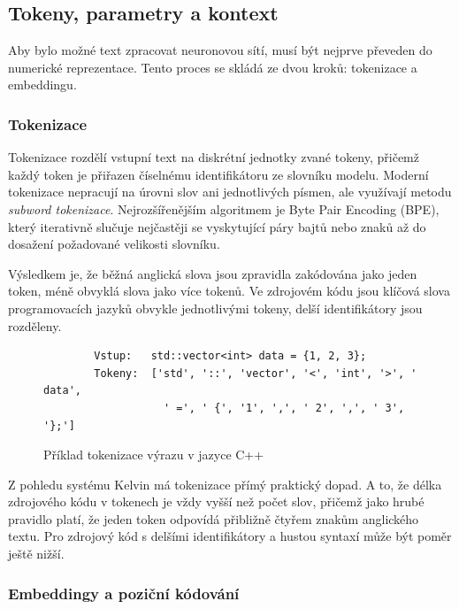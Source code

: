 \subsection{Tokeny, parametry a kontext}
\label{subsec:llm-tokens-parameters-context}

Aby bylo možné text zpracovat neuronovou sítí, musí být nejprve převeden do numerické reprezentace.
Tento proces se skládá ze dvou kroků: tokenizace a embeddingu.

\subsubsection*{Tokenizace}
\label{subsubsec:tokenization}

Tokenizace rozdělí vstupní text na diskrétní jednotky zvané tokeny, přičemž každý token je přiřazen číselnému identifikátoru ze slovníku modelu.
Moderní tokenizace nepracují na úrovni slov ani jednotlivých písmen, ale využívají metodu \textit{subword tokenizace}.
Nejrozšířenějším algoritmem je Byte Pair Encoding (BPE), který iterativně slučuje nejčastěji se vyskytující páry bajtů nebo znaků až do dosažení požadované velikosti slovníku.

Výsledkem je, že běžná anglická slova jsou zpravidla zakódována jako jeden token, méně obvyklá slova jako více tokenů.
Ve zdrojovém kódu jsou klíčová slova programovacích jazyků obvykle jednotlivými tokeny, delší identifikátory jsou rozděleny.

\begin{figure}[H]
    \centering
    \begin{verbatim}
        Vstup:   std::vector<int> data = {1, 2, 3};
        Tokeny:  ['std', '::', 'vector', '<', 'int', '>', ' data',
                   ' =', ' {', '1', ',', ' 2', ',', ' 3', '};']
    \end{verbatim}
    \caption{Příklad tokenizace výrazu v jazyce C++}
    \label{fig:tokenization-example}
\end{figure}

Z pohledu systému Kelvin má tokenizace přímý praktický dopad.
A to, že délka zdrojového kódu v tokenech je vždy vyšší než počet slov, přičemž jako hrubé pravidlo platí, že jeden token odpovídá přibližně čtyřem znakům anglického textu.
Pro zdrojový kód s delšími identifikátory a hustou syntaxí může být poměr ještě nižší.

\subsubsection*{Embeddingy a poziční kódování}
\label{subsubsec:embedding-positional-encoding}

